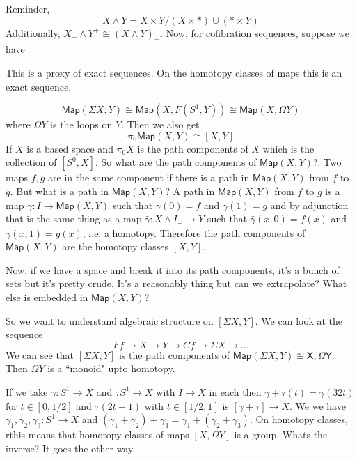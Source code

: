 \documentclass[12pt]{article}
\theoremstyle{definition}
\begin{document}
	Reminder, \[
	X\wedge Y =X\times Y/\left(X\times \ast \right)\cup (\ast \times Y)
	\]
	Additionally, $X_+\wedge Y^+\cong (X\wedge Y)_+$. Now, for cofibration sequences, suppose we have
	\begin{center}
	\end{center}
	This is a proxy of exact sequences. On the homotopy classes of maps this is an exact sequence. 
	
	\[
	\mathsf{Map}(\Sigma X, Y)\cong \mathsf{Map}(X,F(S^1,Y))\cong \mathsf{Map}(X,\Omega Y)
	\]
	where $\Omega Y$ is the loops on $Y$. Then we also get \[
	\pi_0 \mathsf{Map}(X,Y)\cong [X,Y] 
	\]
	If $X$ is a based space and $\pi_0 X$ is the path components of $X$ which is the collection of $[S^0,X]$. So what are the path components of $\mathsf{Map}(X,Y)$?. Two maps $f,g$ are in the same component if there is a path in $\mathsf{Map}(X,Y)$ from $f$ to $g$. But what is a path in $\mathsf{Map}(X,Y)$? A path in $\mathsf{Map}(X,Y)$ from $f$ to $g$ is a map $\gamma:I\to \mathsf{Map}(X,Y)$ such that $\gamma(0)=f$ and $\gamma(1)=g$ and by adjunction that is the same thing as a map $\bar\gamma:X\wedge I_+ \to Y$ such that $\bar\gamma(x,0)= f(x)$ and $\bar\gamma(x,1)=g(x)$, i.e. a homotopy. Therefore the path components of $\mathsf{Map}(X,Y)$ are the homotopy classes $[X,Y]$.
	
	Now, if we have a space and break it into its path components, it's a bunch of sets but it's pretty crude. It's a reasonably thing but can we extrapolate? What else is embedded in $\mathsf{Map}(X,Y)$?
	
	So we want to understand algebraic structure on $[\Sigma X, Y]$. We can look at the sequence \[
	Ff\to X\to Y \to Cf\to \Sigma X\to \dots 
	\]
	We can see that $[\Sigma X,Y]$ is the path components of $\mathsf{Map}(\Sigma X,Y)\cong \mathsf{X,\Omega Y}$. Then $\Omega Y$ is a ``monoid" upto homotopy.
	
	If we take $\gamma: S^1\to X$ and $\tau S^1\to X$ with $I\to X$ in each then $\gamma+\tau(t)=\gamma(32t)$ for $t\in [0,1/2]$ and $\tau(2t-1)$ with $t\in [1/2,1]$ is $[\gamma+\tau]\to X$.  We we have $\gamma_1, \gamma_2,\gamma_3: S^1\to X$  and $(\gamma_1+\gamma_2)+\gamma_3=\gamma_1+(\gamma_2+\gamma_3)$. On homotopy classes, rthis means that homotopy classes of maps $[X,\Omega Y]$ is a group. Whats the inverse? It goes the other way. 
	
\end{document}
